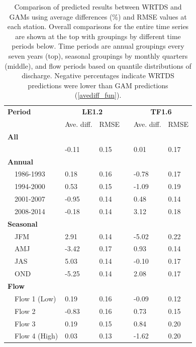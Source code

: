 \documentclass[letterpaper,12pt,oneside]{article}\usepackage[]{graphicx}\usepackage[]{color}
\begin{document}
\begin{table}[!tbp]
\caption{Comparison of predicted results between \ac{WRTDS} and \acp{GAM} using average differences (\%) and \ac{RMSE} values at each station.  Overall comparisons for the entire time series are shown at the top with groupings by different time periods below.  Time periods are annual groupings every seven years (top), seasonal groupings by monthly quarters (middle), and flow periods based on quantile distributions of discharge. Negative percentages indicate \ac{WRTDS} predictions were lower than \ac{GAM} predictions (\cref{avediff_fun}).\label{tab:perfbtw}} 
\begin{center}
\begin{tabular}{lllcll}
\hline\hline
\multicolumn{1}{l}{\bfseries Period}&\multicolumn{2}{c}{\bfseries LE1.2}&\multicolumn{1}{c}{\bfseries }&\multicolumn{2}{c}{\bfseries TF1.6}\tabularnewline
\cline{2-3} \cline{5-6}
\multicolumn{1}{l}{}&\multicolumn{1}{c}{Ave. diff.}&\multicolumn{1}{c}{\ac{RMSE}}&\multicolumn{1}{c}{}&\multicolumn{1}{c}{Ave. diff.}&\multicolumn{1}{c}{\ac{RMSE}}\tabularnewline
\hline
{\bfseries All}&&&&&\tabularnewline
~~&-0.11&0.15&& 0.01&0.17\tabularnewline
\hline
{\bfseries Annual}&&&&&\tabularnewline
~~1986-1993& 0.18&0.16&&-0.78&0.17\tabularnewline
~~1994-2000& 0.53&0.15&&-1.09&0.19\tabularnewline
~~2001-2007&-0.95&0.14&& 0.48&0.14\tabularnewline
~~2008-2014&-0.18&0.14&& 3.12&0.18\tabularnewline
\hline
{\bfseries Seasonal}&&&&&\tabularnewline
~~JFM& 2.91&0.14&&-5.02&0.22\tabularnewline
~~AMJ&-3.42&0.17&& 0.93&0.14\tabularnewline
~~JAS& 5.03&0.14&&-0.10&0.17\tabularnewline
~~OND&-5.25&0.14&& 2.08&0.17\tabularnewline
\hline
{\bfseries Flow}&&&&&\tabularnewline
~~Flow 1 (Low)& 0.19&0.16&&-0.09&0.12\tabularnewline
~~Flow 2&-0.83&0.16&& 0.73&0.15\tabularnewline
~~Flow 3& 0.19&0.15&& 0.84&0.20\tabularnewline
~~Flow 4 (High)& 0.03&0.13&&-1.62&0.20\tabularnewline
\hline
\end{tabular}\end{center}

\end{table}
\end{document}
